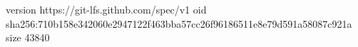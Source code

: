 version https://git-lfs.github.com/spec/v1
oid sha256:710b158e342060e2947122f463bba57cc26f96186511e8e79d591a58087c921a
size 43840
